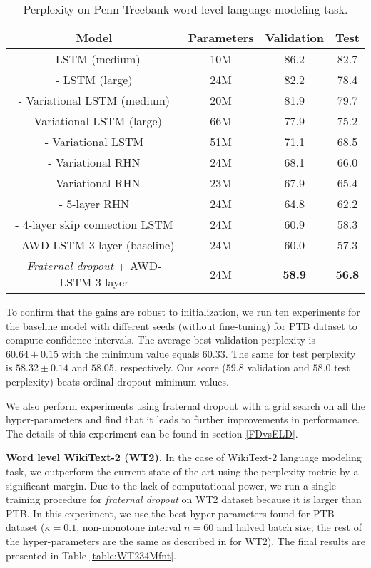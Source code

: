 \documentclass{article} \usepackage{iclr2018_conference,times}
\begin{document}
\begin{table}[t]
\vspace{-0.08cm}
\centering
\begin{tabular}{c | c c c} 
\textbf{Model} & \textbf{Parameters}  & \textbf{Validation} & \textbf{Test}\\
\hline
\cite{zaremba2014recurrent} - LSTM (medium) & 10M & 86.2 & 82.7\\
\cite{zaremba2014recurrent} - LSTM (large) & 24M & 82.2 & 78.4\\
\cite{vdropout} - Variational LSTM (medium) & 20M & 81.9 & 79.7\\
\cite{vdropout} - Variational LSTM (large) & 66M & 77.9 & 75.2\\
\cite{inan2016tying} - Variational LSTM & 51M & 71.1 & 68.5\\
\cite{inan2016tying} - Variational RHN & 24M & 68.1 & 66.0\\
\cite{zilly2016recurrent} - Variational RHN & 23M & 67.9 & 65.4\\
\cite{melis2017state} - 5-layer RHN & 24M & 64.8 & 62.2\\
\cite{melis2017state} - 4-layer skip connection LSTM & 24M & 60.9 & 58.3\\
\hline
\cite{merity2017regularizing} - AWD-LSTM 3-layer (baseline) & 24M & 60.0 & 57.3 \\
\hline
\emph{Fraternal dropout} + AWD-LSTM 3-layer & 24M & \textbf{58.9} & \textbf{56.8}\\
\end{tabular}
\caption{Perplexity on Penn Treebank word level language modeling task.}
\label{table:PTB24M}
\vspace{-0.08cm}
\end{table}

To confirm that the gains are robust to initialization, we run ten experiments for the baseline model with different seeds (without fine-tuning) for PTB dataset to compute confidence intervals. The average best validation perplexity is $60.64 \pm 0.15$ with the minimum value equals $60.33$. The same for test perplexity is $58.32 \pm 0.14$ and $58.05$, respectively. Our score ($59.8$ validation and $58.0$ test perplexity) beats ordinal dropout minimum values.

We also perform experiments using fraternal dropout with a grid search on all the hyper-parameters and find that it leads to further improvements in performance. The details of this experiment can be found in section \ref{FDvsELD}. 

\textbf{Word level WikiText-2 (WT2).} In the case of WikiText-2 language modeling task, we outperform the current state-of-the-art using the perplexity metric by a significant margin. Due to the lack of computational power, we run a single training procedure for \emph{fraternal dropout} on WT2 dataset because it is larger than PTB. In this experiment, we use the best hyper-parameters found for PTB dataset ($\kappa = 0.1$, non-monotone interval $n=60$ and halved batch size; the rest of the hyper-parameters are the same as described in \cite{melis2017state} for WT2). The final results are presented in Table \ref{table:WT234Mfnt}.
\end{document}
